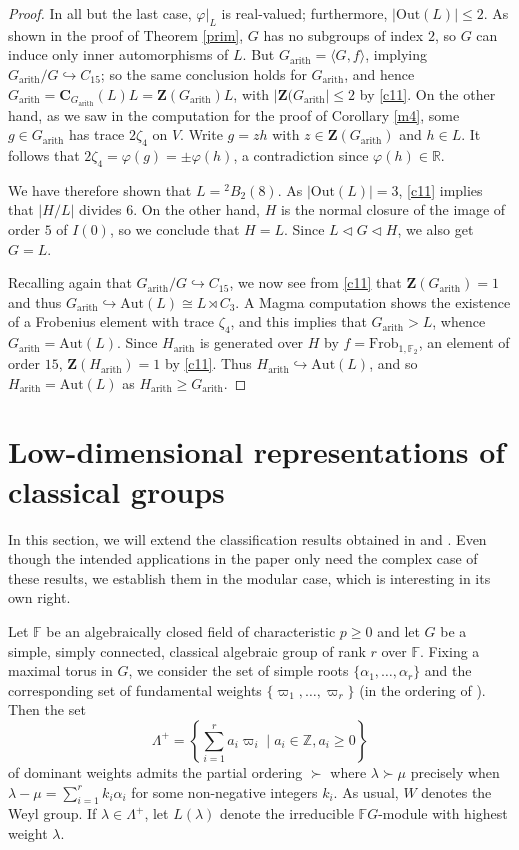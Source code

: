 \documentclass[11pt]{amsart}
\theoremstyle{plain}
\theoremstyle{definition}
\numberwithin{thm}{section}
\numberwithin{equation}{thm}
\newcommand{\al}{\alpha}
\newcommand{\om}{\varpi}
\newcommand{\inj}{\hookrightarrow}
\newcommand{\Aut}{\mathrm{Aut}}
\newcommand{\Out}{\mathrm{Out}}
\newcommand{\F}{{\mathbb F}}
\newcommand{\R}{{\mathbb R}}
\newcommand{\Z}{{\mathbb Z}}
\newcommand{\0}{\emptyset}
\newcommand{\ZB}{{\mathbf Z}}
\newcommand{\CB}{{\mathbf C}}
\newcommand{\ari}{{\mathrm {arith}}}
\newcommand{\LP}{{\Lambda^{+}}}
\newcommand{\lam}{\lambda}
\newcommand{\tw}[1]{{}^#1\!}
\newcommand{\Frob}{\mathrm{Frob}}
\begin{document}
\begin{proof}
In all but the last case, $\varphi|_L$ is real-valued; furthermore, $|\Out(L)| \leq 2$. As shown in the proof of Theorem \ref{prim}, 
$G$ has no subgroups of
index $2$, so $G$ can induce only inner automorphisms of $L$. But $G_{\ari}=\langle G,f\rangle$, implying
$G_{\ari}/G \inj C_{15}$; so the same conclusion holds for
$G_{\ari}$, and hence $G_{\ari} = \CB_{G_{\ari}}(L)L = \ZB(G_{\ari})L$, with $|\ZB(G_{\ari}| \leq 2$ by \eqref{c11}. 
On the other hand, as 
we saw in the computation for the proof of Corollary \ref{m4}, some $g \in G_{\ari}$ has trace $2\zeta_4$ on $V$.
Write $g=zh$ with $z \in \ZB(G_{\ari})$ and $h \in L$. It follows
that $2\zeta_4 = \varphi(g) = \pm \varphi(h)$, a contradiction since $\varphi(h) \in \R$.

We have therefore shown that $L = \tw2 B_2(8)$. As $|\Out(L)| = 3$, \eqref{c11} implies that $|H/L|$ divides $6$. On the other hand,
$H$ is the normal closure of the image of order $5$ of $I(0)$, so we conclude that $H=L$. Since $L \lhd G \lhd H$, we also 
get $G=L$.

Recalling again that $G_{\ari}/G \inj C_{15}$, we now see from \eqref{c11} that $\ZB(G_{\ari}) = 1$ and thus 
$G_{\ari} \inj \Aut(L)  \cong L \rtimes C_3$. A {\sc Magma} computation shows the existence of a Frobenius element with trace $\zeta_4$, and this implies that $G_{\ari} > L$,
whence $G_{\ari} = \Aut(L)$. Since $H_{\ari}$ is generated over $H$ by $f=\Frob_{1,\F_2}$, an element of order
$15$, $\ZB(H_{\ari})=1$ by \eqref{c11}. Thus $H_{\ari} \inj \Aut(L)$, and so $H_{\ari} = \Aut(L)$ as 
$H_{\ari} \geq G_{\ari}$.
\end{proof}

\section{Low-dimensional representations of classical groups}\label{low-dim}
In this section, we will extend the classification results obtained in \cite[Proposition 5.4.11]{KlL} and \cite[Theorem 5.1]{Lu}.
Even though the intended applications in the paper only need the complex case of these results, we establish them in the modular
case, which is interesting in its own right.
  
Let $\F$ be an algebraically closed field of characteristic $p \geq 0$ and 
let $G$ be a simple, simply connected, classical algebraic group of rank $r$ over 
$\F$. Fixing a maximal torus in $G$, we consider 
the set of simple roots $\{ \al_1, \ldots, \al_r\}$ and the corresponding
set of fundamental weights $\{ \om_1, \ldots ,\om_r\}$ (in the
ordering of \cite{OV}). Then the set 
$$\LP = \left\{ \sum^{r}_{i=1}a_i \om_i \mid a_i \in \Z,a_i \geq 0
  \right\}$$
of dominant weights admits the 
partial ordering $\succ$ where $\lam \succ \mu$ precisely when 
$\lam - \mu = \sum^{r}_{i=1}k_i\al_i$ for some non-negative integers $k_i$.
As usual, $W$ denotes the Weyl group. If 
$\lam \in \LP$, let $L(\lam)$ denote the irreducible $\F G$-module
with highest weight $\lam$. 
\end{document}
